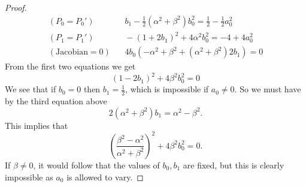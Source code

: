 \documentclass[10pt,a4paper]{amsart}
\begin{document}
\begin{proof}
\[\begin{aligned}
        (P_0=P_0')&\ \ \ \ b_1-\frac{1}{2}(\alpha^2+\beta^2)b_0^2 = \frac{1}{2}-\frac{1}{2}a_0^2\\
        (P_1=P_1')&\ \ \ \ -(1+2b_1)^2+4\alpha^2b_0^2 = -4+4a_0^2\\
        (\mathrm{Jacobian}=0)&\ \ \ \ 4b_0(-\alpha^2+\beta^2+(\alpha^2+\beta^2)2b_1)=0
    \end{aligned}
    \]
    From the first two equations we get
    $$(1-2b_1)^2 + 4\beta^2b_0^2 = 0$$
    We see that if $b_0=0$ then $b_1=\frac{1}{2}$, which is impossible if $a_0\neq 0$. So we must have by the third equation above
    $$2(\alpha^2+\beta^2)b_1 = \alpha^2-\beta^2.$$
    This implies that
    $$\left(\frac{\beta^2-\alpha^2}{\alpha^2+\beta^2}\right)^2 + 4\beta^2b_0^2 = 0.$$
    If $\beta\neq 0$, it would follow that the values of $b_0, b_1$ are fixed, but this is clearly impossible as $a_0$ is allowed to vary.
\end{proof}
\end{document}
